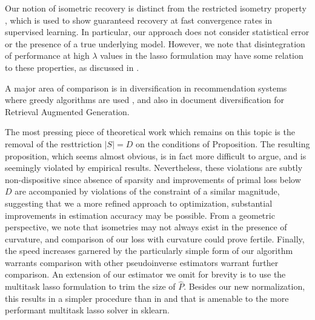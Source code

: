 
Our notion of isometric recovery is distinct from the restricted isometry property \cite{Candes2005-dd, Hastie2015-qa}, which is used to show guaranteed recovery at fast convergence rates in supervised learning.
In particular, our approach does not consider statistical error or the presence of a true underlying model.
However, we note that disintegration of performance at high $\lambda$ values in the lasso formulation may have some relation to these properties, as discussed in \cite{Koelle2022-ju, Koelle2024-no}.


A major area of comparison is in diversification in recommendation systems where greedy algorithms are used \cite{Carbonell2017-gi, Wu2019-uk}, and also in document diversification for Retrieval Augmented Generation.



The most pressing piece of theoretical work which remains on this topic is the removal of the resttriction $|S| = D$ on the conditions of Proposition.
The resulting proposition, which seems almost obvious, is in fact more difficult to argue, and is seemingly violated by empirical results.
Nevertheless, these violations are subtly non-dispositive since absence of sparsity and improvements of primal loss below $D$ are accompanied by violations of the constraint of a similar magnitude, suggesting that we a more refined approach to optimization, substantial improvements in estimation accuracy may be possible.
From a geometric perspective, we note that isometries may not always exist in the presence of curvature, and comparison of our loss with curvature could prove fertile.
Finally, the speed increases garnered by the particularly simple form of our algorithm warrants comparison with other pseudoinverse estimators warrant further comparison.
An extension of our estimator we omit for brevity is to use the multitask lasso formulation to trim the size of $\hat P$.
Besides our new normalization, this results in a simpler procedure than in \citet{Koelle2022-lp} and \citet{Koelle2024-no} that is amenable to the more performant multitask lasso solver in sklearn.
